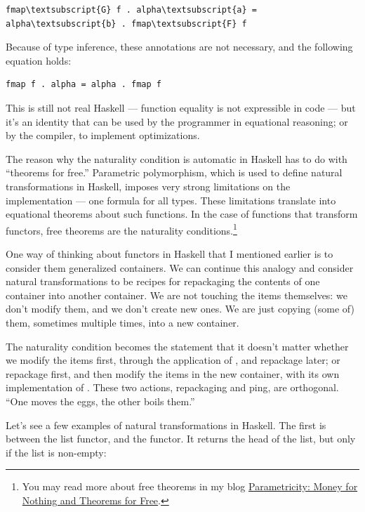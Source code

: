 \begin{Verbatim}[commandchars=\\\{\}]
fmap\textsubscript{G} f . alpha\textsubscript{a} = alpha\textsubscript{b} . fmap\textsubscript{F} f
\end{Verbatim}
Because of type inference, these annotations are not necessary, and the
following equation holds:

\begin{verbatim}
fmap f . alpha = alpha . fmap f
\end{verbatim}
This is still not real Haskell --- function equality is not expressible
in code --- but it's an identity that can be used by the programmer in
equational reasoning; or by the compiler, to implement optimizations.

The reason why the naturality condition is automatic in Haskell has to
do with ``theorems for free.'' Parametric polymorphism, which is used to
define natural transformations in Haskell, imposes very strong
limitations on the implementation --- one formula for all types. These
limitations translate into equational theorems about such functions. In
the case of functions that transform functors, free theorems are the
naturality conditions.\footnote{
You may read more about free theorems in my
blog \href{https://bartoszmilewski.com/2014/09/22/parametricity-money-for-nothing-and-theorems-for-free/}{Parametricity:
Money for Nothing and Theorems for Free}.}

One way of thinking about functors in Haskell that I mentioned earlier
is to consider them generalized containers. We can continue this analogy
and consider natural transformations to be recipes for repackaging the
contents of one container into another container. We are not touching
the items themselves: we don't modify them, and we don't create new
ones. We are just copying (some of) them, sometimes multiple times, into
a new container.

The naturality condition becomes the statement that it doesn't matter
whether we modify the items first, through the application of
, and repackage later; or repackage first, and then modify
the items in the new container, with its own implementation of
. These two actions, repackaging and ping, are
orthogonal. ``One moves the eggs, the other boils them.''

Let's see a few examples of natural transformations in Haskell. The
first is between the list functor, and the  functor. It
returns the head of the list, but only if the list is non-empty:

